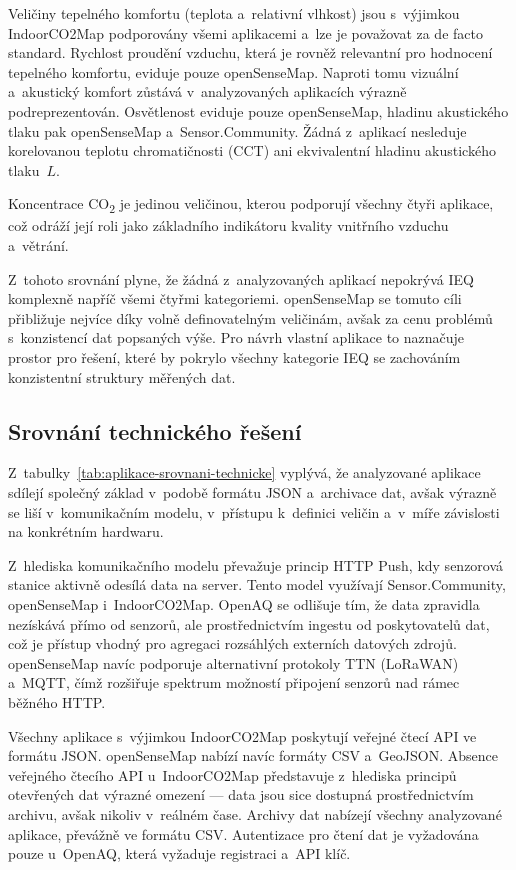Veličiny tepelného komfortu (teplota a~relativní vlhkost) jsou s~výjimkou IndoorCO2Map podporovány všemi aplikacemi a~lze je považovat za de facto standard. Rychlost proudění vzduchu, která je rovněž relevantní pro hodnocení tepelného komfortu, eviduje pouze openSenseMap. Naproti tomu vizuální a~akustický komfort zůstává v~analyzovaných aplikacích výrazně podreprezentován. Osvětlenost eviduje pouze openSenseMap, hladinu akustického tlaku pak openSenseMap a~Sensor.Community. Žádná z~aplikací nesleduje korelovanou teplotu chromatičnosti (CCT) ani ekvivalentní hladinu akustického tlaku~$L$.

Koncentrace CO\textsubscript{2} je jedinou veličinou, kterou podporují všechny čtyři aplikace, což odráží její roli jako základního indikátoru kvality vnitřního vzduchu a~větrání.

Z~tohoto srovnání plyne, že žádná z~analyzovaných aplikací nepokrývá IEQ komplexně napříč všemi čtyřmi kategoriemi. openSenseMap se tomuto cíli přibližuje nejvíce díky volně definovatelným veličinám, avšak za cenu problémů s~konzistencí dat popsaných výše. Pro návrh vlastní aplikace to naznačuje prostor pro řešení, které by pokrylo všechny kategorie IEQ se zachováním konzistentní struktury měřených dat.

\FloatBarrier
\subsection{Srovnání technického řešení}

Z~tabulky~\ref{tab:aplikace-srovnani-technicke} vyplývá, že analyzované aplikace sdílejí společný základ v~podobě formátu JSON a~archivace dat, avšak výrazně se liší v~komunikačním modelu, v~přístupu k~definici veličin a~v~míře závislosti na konkrétním hardwaru.

Z~hlediska komunikačního modelu převažuje princip HTTP Push, kdy senzorová stanice aktivně odesílá data na server. Tento model využívají Sensor.Community, openSenseMap i~IndoorCO2Map. OpenAQ se odlišuje tím, že data zpravidla nezískává přímo od senzorů, ale prostřednictvím ingestu od poskytovatelů dat, což je přístup vhodný pro agregaci rozsáhlých externích datových zdrojů. openSenseMap navíc podporuje alternativní protokoly TTN (LoRaWAN) a~MQTT, čímž rozšiřuje spektrum možností připojení senzorů nad rámec běžného HTTP.

Všechny aplikace s~výjimkou IndoorCO2Map poskytují veřejné čtecí API ve formátu JSON. openSenseMap nabízí navíc formáty CSV a~GeoJSON. Absence veřejného čtecího API u~IndoorCO2Map představuje z~hlediska principů otevřených dat výrazné omezení --- data jsou sice dostupná prostřednictvím archivu, avšak nikoliv v~reálném čase. Archivy dat nabízejí všechny analyzované aplikace, převážně ve formátu CSV. Autentizace pro čtení dat je vyžadována pouze u~OpenAQ, která vyžaduje registraci a~API klíč.

